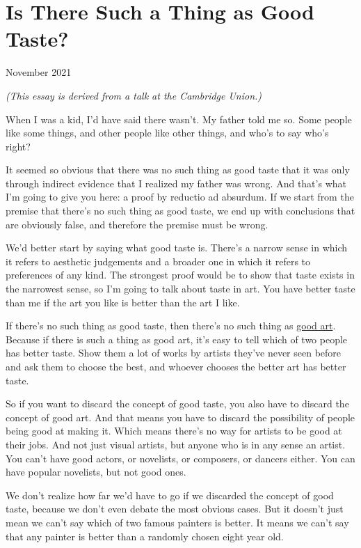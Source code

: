 \chapter{Is There Such a Thing as Good Taste?}

November 2021

\emph{(This essay is derived from a talk at the Cambridge Union.)}

When I was a kid, I'd have said there wasn't. My father told me so. Some
people like some things, and other people like other things, and who's
to say who's right?

It seemed so obvious that there was no such thing as good taste that it
was only through indirect evidence that I realized my father was wrong.
And that's what I'm going to give you here: a proof by reductio ad
absurdum. If we start from the premise that there's no such thing as
good taste, we end up with conclusions that are obviously false, and
therefore the premise must be wrong.

We'd better start by saying what good taste is. There's a narrow sense
in which it refers to aesthetic judgements and a broader one in which it
refers to preferences of any kind. The strongest proof would be to show
that taste exists in the narrowest sense, so I'm going to talk about
taste in art. You have better taste than me if the art you like is
better than the art I like.

If there's no such thing as good taste, then there's no such thing as
\href{goodart.html}{good art}. Because if there is such a thing as good
art, it's easy to tell which of two people has better taste. Show them a
lot of works by artists they've never seen before and ask them to choose
the best, and whoever chooses the better art has better taste.

So if you want to discard the concept of good taste, you also have to
discard the concept of good art. And that means you have to discard the
possibility of people being good at making it. Which means there's no
way for artists to be good at their jobs. And not just visual artists,
but anyone who is in any sense an artist. You can't have good actors, or
novelists, or composers, or dancers either. You can have popular
novelists, but not good ones.

We don't realize how far we'd have to go if we discarded the concept of
good taste, because we don't even debate the most obvious cases. But it
doesn't just mean we can't say which of two famous painters is better.
It means we can't say that any painter is better than a randomly chosen
eight year old.

